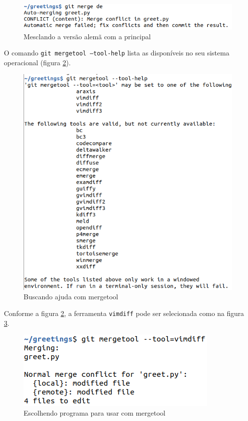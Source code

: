 \documentclass[a4paper]{book}
\begin{document}
\begin{figure}[ht]
\caption{Mesclando a versão alemã com a principal}
\label{fig:53}
\centering
\includegraphics[scale=0.6]{"images/53-Mesclando a versão alemã com a principal.png"}
\end{figure}

O comando \texttt{git mergetool --tool-help}
lista as disponíveis no seu sistema operacional
(figura \ref{fig:54}).

\begin{figure}[h!]
\caption{Buscando ajuda com mergetool}
\label{fig:54}
\centering
\includegraphics[scale=0.6]{"images/54-Buscando ajuda com mergetool.png"}
\end{figure}

Conforme a figura \ref{fig:54}, a ferramenta \texttt{vimdiff}
pode ser selecionada como na figura \ref{fig:55}.

\begin{figure}[h!]
\caption{Escolhendo programa para usar com mergetool}
\label{fig:55}
\centering
\includegraphics[scale=0.6]{"images/55-Escolhendo programa para usar com mergetool.png"}
\end{figure}
\end{document}
